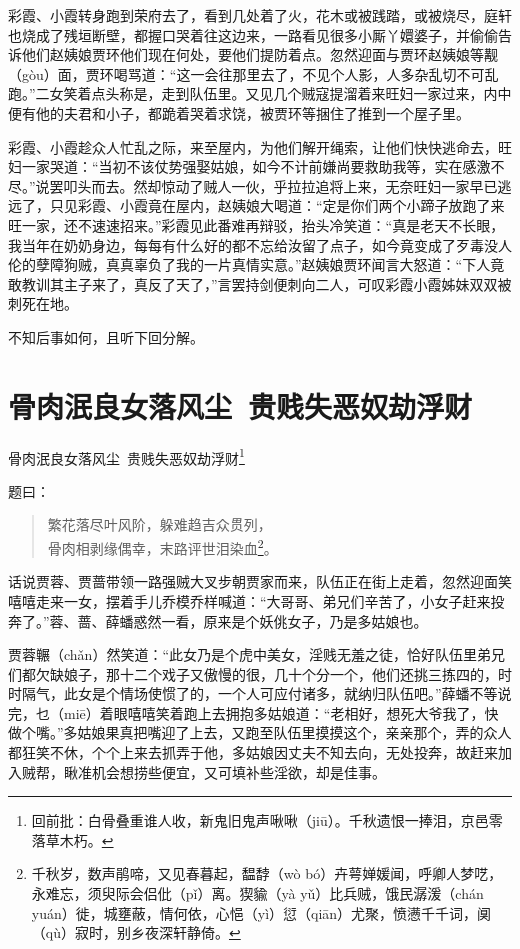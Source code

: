 \documentclass[12pt,oneside]{book}
\newenvironment{shici}{%
\begin{verse}%
\centering\large\hspace{12pt}}%
{\end{verse}}
\begin{document}
彩霞、小霞转身跑到荣府去了，看到几处着了火，花木或被践踏，或被烧尽，庭轩也烧成了残垣断壁，都握口哭着往这边来，一路看见很多小厮丫嬛婆子，并偷偷告诉他们赵姨娘贾环他们现在何处，要他们提防着点。忽然迎面与贾环赵姨娘等觏（gòu）面，贾环喝骂道：“这一会往那里去了，不见个人影，人多杂乱切不可乱跑。”二女笑着点头称是，走到队伍里。又见几个贼寇提溜着来旺妇一家过来，内中便有他的夫君和小子，都跪着哭着求饶，被贾环等捆住了推到一个屋子里。

彩霞、小霞趁众人忙乱之际，来至屋内，为他们解开绳索，让他们快快逃命去，旺妇一家哭道：“当初不该仗势强娶姑娘，如今不计前嫌尚要救助我等，实在感激不尽。”说罢叩头而去。然却惊动了贼人一伙，乎拉拉追将上来，无奈旺妇一家早已逃远了，只见彩霞、小霞竟在屋内，赵姨娘大喝道：“定是你们两个小蹄子放跑了来旺一家，还不速速招来。”彩霞见此番难再辩驳，抬头冷笑道：“真是老天不长眼，我当年在奶奶身边，每每有什么好的都不忘给汝留了点子，如今竟变成了歹毒没人伦的孽障狗贼，真真辜负了我的一片真情实意。”赵姨娘贾环闻言大怒道：“下人竟敢教训其主子来了，真反了天了，”言罢持剑便刺向二人，可叹彩霞小霞姊妹双双被刺死在地。

不知后事如何，且听下回分解。
 
 
\chapter{骨肉泯良女落风尘~贵贱失恶奴劫浮财}
骨肉泯良女落风尘~贵贱失恶奴劫浮财\footnote{回前批：白骨叠重谁人收，新鬼旧鬼声啾啾（jiū）。千秋遗恨一捧泪，京邑零落草木朽。}

题曰：

\begin{shici}
繁花落尽叶风阶，躲难趋吉众贯列，\\
骨肉相剥缘偶幸，末路评世泪染血\footnote{千秋岁，数声鹃啼，又见春暮起，馧馞（wò bó）卉萼婵媛闻，呼卿人梦呓，永难忘，须臾际会侣仳（pǐ）离。猰貐（yà yǔ）比兵贼，饿民潺湲（chán yuán）徙，城壅蔽，情何依，心悒（yì）愆（qiān）尤聚，愤懑千千词，阒（qù）寂时，别乡夜深轩静倚。}。
\end{shici}


话说贾蓉、贾蔷带领一路强贼大叉步朝贾家而来，队伍正在街上走着，忽然迎面笑嘻嘻走来一女，摆着手儿乔模乔样喊道：“大哥哥、弟兄们辛苦了，小女子赶来投奔了。”蓉、蔷、薛蟠惑然一看，原来是个妖佻女子，乃是多姑娘也。


贾蓉冁（chǎn）然笑道：“此女乃是个虎中美女，淫贱无羞之徒，恰好队伍里弟兄们都欠缺娘子，那十二个戏子又傲慢的很，几十个分一个，他们还挑三拣四的，时时隔气，此女是个情场使惯了的，一个人可应付诸多，就纳归队伍吧。”薛蟠不等说完，乜（miē）着眼嘻嘻笑着跑上去拥抱多姑娘道：“老相好，想死大爷我了，快做个嘴。”多姑娘果真把嘴迎了上去，又跑至队伍里摸摸这个，亲亲那个，弄的众人都狂笑不休，个个上来去抓弄于他，多姑娘因丈夫不知去向，无处投奔，故赶来加入贼帮，瞅准机会想捞些便宜，又可填补些淫欲，却是佳事。
\end{document}
